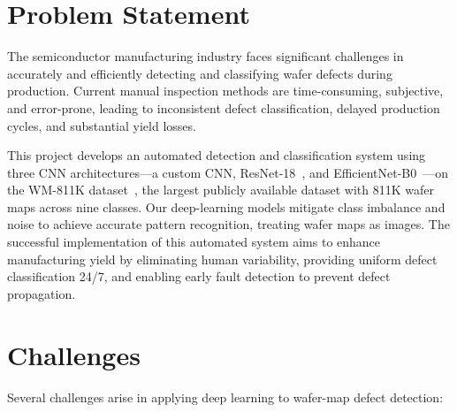 \documentclass[conference]{IEEEtran}
\begin{document}
\section{Problem Statement}
\label{sec:problem}

The semiconductor manufacturing industry faces significant challenges in
accurately and efficiently detecting and classifying wafer defects during
production. Current manual inspection methods are time-consuming, subjective,
and error-prone, leading to inconsistent defect classification, delayed
production cycles, and substantial yield losses.

This project develops an automated detection and classification system using
three CNN architectures---a custom CNN, ResNet-18~\cite{he2016}, and
EfficientNet-B0~\cite{tan2019}---on the WM-811K dataset~\cite{wu2015}, the
largest publicly available dataset with 811K wafer maps across nine classes.
Our deep-learning models mitigate class imbalance and noise to achieve
accurate pattern recognition, treating wafer maps as images. The successful
implementation of this automated system aims to enhance manufacturing yield by
eliminating human variability, providing uniform defect classification 24/7,
and enabling early fault detection to prevent defect propagation.

\section{Challenges}
\label{sec:challenges}

Several challenges arise in applying deep learning to wafer-map defect
detection:
\end{document}

